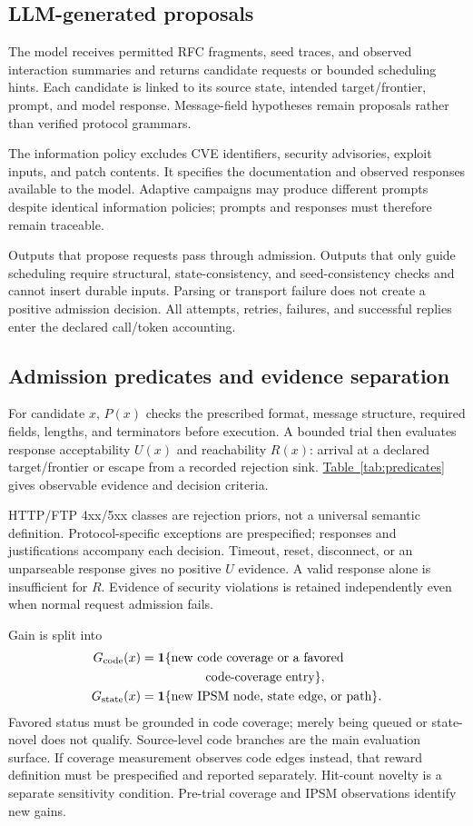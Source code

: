 \documentclass[final,5p,times,number]{elsarticle}
\newcommand{\gcode}{G_{\mathrm{code}}}
\newcommand{\gstate}{G_{\mathrm{state}}}
\newcommand{\namedref}[2]{\hyperref[#2]{#1~\ref*{#2}}}
\begin{document}
\subsection{LLM-generated proposals}
The model receives permitted RFC fragments, seed traces, and observed interaction summaries and returns candidate requests or bounded scheduling hints. Each candidate is linked to its source state, intended target/frontier, prompt, and model response. Message-field hypotheses remain proposals rather than verified protocol grammars.

The information policy excludes CVE identifiers, security advisories, exploit inputs, and patch contents. It specifies the documentation and observed responses available to the model. Adaptive campaigns may produce different prompts despite identical information policies; prompts and responses must therefore remain traceable.

Outputs that propose requests pass through admission. Outputs that only guide scheduling require structural, state-consistency, and seed-consistency checks and cannot insert durable inputs. Parsing or transport failure does not create a positive admission decision. All attempts, retries, failures, and successful replies enter the declared call/token accounting.

\subsection{Admission predicates and evidence separation}
For candidate $x$, $P(x)$ checks the prescribed format, message structure, required fields, lengths, and terminators before execution. A bounded trial then evaluates response acceptability $U(x)$ and reachability $R(x)$: arrival at a declared target/frontier or escape from a recorded rejection sink. \namedref{Table}{tab:predicates} gives observable evidence and decision criteria.

HTTP/FTP 4xx/5xx classes are rejection priors, not a universal semantic definition. Protocol-specific exceptions are prespecified; responses and justifications accompany each decision. Timeout, reset, disconnect, or an unparseable response gives no positive $U$ evidence. A valid response alone is insufficient for $R$. Evidence of security violations is retained independently even when normal request admission fails.

Gain is split into
\begin{align}
\gcode(x)&=\mathbf{1}\{\text{new code coverage or a favored}\nonumber\\
&\hspace{18mm}\text{code-coverage entry}\},\label{eq:gcode}\\
\gstate(x)&=\mathbf{1}\{\text{new IPSM node, state edge, or path}\}.\label{eq:gstate}
\end{align}
Favored status must be grounded in code coverage; merely being queued or state-novel does not qualify. Source-level code branches are the main evaluation surface. If coverage measurement observes code edges instead, that reward definition must be prespecified and reported separately. Hit-count novelty is a separate sensitivity condition. Pre-trial coverage and IPSM observations identify new gains.
\end{document}
